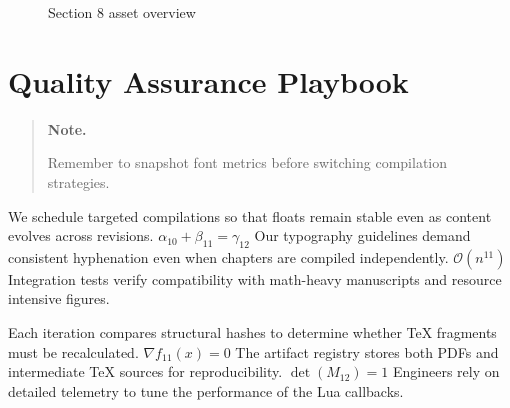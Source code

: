 \documentclass[12pt,a4paper,twocolumn]{article}
\newcommand{\paraid}[1]{\par\noindent\hypertarget{#1}{\ignorespaces}}
\begin{document}
\begin{figure}[htbp]
\centering
\hypertarget{fig-sec8}{}


\caption{Section 8 asset overview}
\label{fig:fig-sec8}
\hypertarget{fig-sec8-end}{}
\end{figure}


\section{Quality Assurance Playbook}
\label{sec9}

\begin{quote}
\hypertarget{sec9-note}{\textbf{Note.}} 
      Remember to snapshot font metrics before switching compilation strategies.
    
\end{quote}

\paraid{sec9-p1}We schedule targeted compilations so that floats remain stable even as content evolves across revisions. $\alpha_{10} + \beta_{11} = \gamma_{12}$ Our typography guidelines demand consistent hyphenation even when chapters are compiled independently. $\mathcal{O}(n^{11})$ Integration tests verify compatibility with math-heavy manuscripts and resource intensive figures.
\par

\paraid{sec9-p2}Each iteration compares structural hashes to determine whether TeX fragments must be recalculated. $\nabla f_{11}(x) = 0$ The artifact registry stores both PDFs and intermediate TeX sources for reproducibility. $\det(M_{12}) = 1$ Engineers rely on detailed telemetry to tune the performance of the Lua callbacks.
\par
\end{document}
